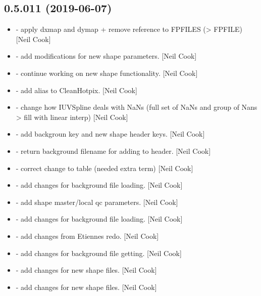 \documentclass[a4paper,10pt,english]{report}
\begin{document}
\subsection{0.5.011 (2019-06-07)}
\label{\detokenize{misc/changelog:id125}}\begin{itemize}
\item {} 
 - apply dxmap and dymap + remove reference to
FPFILES (\textendash{}\textgreater{} FPFILE) {[}Neil Cook{]}

\item {} 
 - add modifications for new shape parameters. {[}Neil
Cook{]}

\item {} 
 - continue working on new shape functionality. {[}Neil
Cook{]}

\item {} 
 - add alias to CleanHotpix. {[}Neil Cook{]}

\item {} 
 - change how IUVSpline deals with NaNs (full set of NaNs
and group of Nans \textendash{}\textgreater{} fill with linear interp) {[}Neil Cook{]}

\item {} 
 - add backgroun key and new shape header keys. {[}Neil
Cook{]}

\item {} 
 - return background filename for adding to header. {[}Neil
Cook{]}

\item {} 
 - correct change to table (needed extra term)
{[}Neil Cook{]}

\item {} 
 - add changes for background file loading.
{[}Neil Cook{]}

\item {} 
 - add shape master/local qc parameters. {[}Neil
Cook{]}

\item {} 
 - add changes for background file loading. {[}Neil
Cook{]}

\item {} 
 - add changes from Etiennes redo. {[}Neil Cook{]}

\item {} 
 - add changes for background file getting. {[}Neil
Cook{]}

\item {} 
 - add changes for new shape files. {[}Neil Cook{]}

\item {} 
 - add changes for new shape files. {[}Neil
Cook{]}

\end{itemize}
\end{document}
